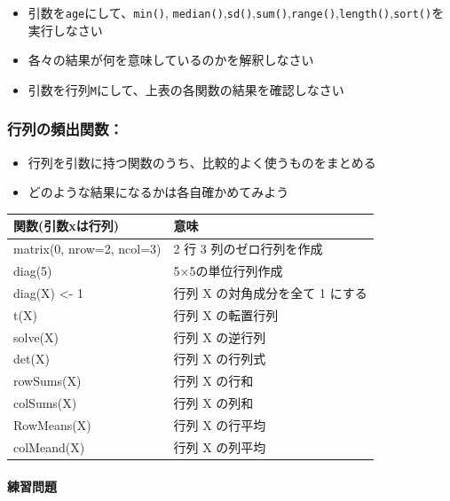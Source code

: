 \documentclass[
]{book}
\providecommand{\tightlist}{%
  \setlength{\itemsep}{0pt}\setlength{\parskip}{0pt}}
\begin{document}
\begin{itemize}
\tightlist
\item
  引数を\texttt{age}にして、\texttt{min()}, \texttt{median()},\texttt{sd()},\texttt{sum()},\texttt{range()},\texttt{length()},\texttt{sort()}を実行しなさい\\
\item
  各々の結果が何を意味しているのかを解釈しなさい\\
\item
  引数を行列\texttt{M}にして、上表の各関数の結果を確認しなさい
\end{itemize}

\hypertarget{ux884cux5217ux306eux983bux51faux95a2ux6570}{%
\subsubsection*{行列の頻出関数：}\label{ux884cux5217ux306eux983bux51faux95a2ux6570}}

\begin{itemize}
\tightlist
\item
  行列を引数に持つ関数のうち、比較的よく使うものをまとめる
\item
  どのような結果になるかは各自確かめてみよう
\end{itemize}

\begin{longtable}[]{@{}ll@{}}
\toprule()
関数(引数xは行列) & 意味 \\
\midrule()
\endhead
matrix(0, nrow=2, ncol=3) & 2 行 3 列のゼロ行列を作成 \\
diag(5) & 5×5の単位行列作成 \\
diag(X) \textless- 1 & 行列 X の対角成分を全て 1 にする \\
t(X) & 行列 X の転置行列 \\
solve(X) & 行列 X の逆行列 \\
det(X) & 行列 X の行列式 \\
rowSums(X) & 行列 X の行和 \\
colSums(X) & 行列 X の列和 \\
RowMeans(X) & 行列 X の行平均 \\
colMeand(X) & 行列 X の列平均 \\
\bottomrule()
\end{longtable}

\hypertarget{ux7df4ux7fd2ux554fux984c-5}{%
\paragraph*{練習問題}\label{ux7df4ux7fd2ux554fux984c-5}}
\end{document}
